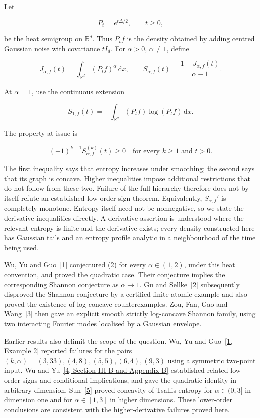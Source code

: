 \documentclass[
  11pt,
]{article}
\begin{document}
Let

\[
P_t=e^{t\Delta/2},\qquad t\geq0,
\]

be the heat semigroup on \(\mathbb R^d\). Thus \(P_tf\) is the density
obtained by adding centred Gaussian noise with covariance \(tI_d\). For
\(\alpha>0\), \(\alpha\ne1\), define

\[
\tag{1}
 J_{\alpha,f}(t)=\int_{\mathbb R^d}(P_tf)^\alpha\,\mathrm dx,
 \qquad
 S_{\alpha,f}(t)=\frac{1-J_{\alpha,f}(t)}{\alpha-1}.
\]

At \(\alpha=1\), use the continuous extension

\[
S_{1,f}(t)=-\int_{\mathbb R^d}(P_tf)\log(P_tf)\,\mathrm dx.
\]

The property at issue is

\[
\tag{2}
 (-1)^{k-1} S_{\alpha,f}^{(k)}(t)\geq0
 \quad\text{for every }k\geq1\text{ and }t>0.
\]

The first inequality says that entropy increases under smoothing; the
second says that its graph is concave. Higher inequalities impose
additional restrictions that do not follow from these two. Failure of
the full hierarchy therefore does not by itself refute an established
low-order sign theorem. Equivalently, \(S_{\alpha,f}'\) is completely
monotone. Entropy itself need not be nonnegative, so we state the
derivative inequalities directly. A derivative assertion is understood
where the relevant entropy is finite and the derivative exists; every
density constructed here has Gaussian tails and an entropy profile
analytic in a neighbourhood of the time being used.

Wu, Yu and Guo~\href{https://arxiv.org/abs/2312.01819v4}{{[}1{]}}
conjectured (2) for every \(\alpha\in(1,2)\), under this heat
convention, and proved the quadratic case. Their conjecture implies the
corresponding Shannon conjecture as \(\alpha\to1\). Gu and
Sellke~\href{https://arxiv.org/abs/2605.11656v1}{{[}2{]}} subsequently
disproved the Shannon conjecture by a certified finite atomic example
and also proved the existence of log-concave counterexamples. Zou, Fan,
Gao and Wang~\href{https://arxiv.org/abs/2608.30275v1}{{[}3{]}} then
gave an explicit smooth strictly log-concave Shannon family, using two
interacting Fourier modes localised by a Gaussian envelope.

Earlier results also delimit the scope of the question. Wu, Yu and
Guo~\href{https://arxiv.org/abs/2312.01819v4}{{[}1, Example 2{]}}
reported failures for the pairs
\((k,\alpha)=(3,33),(4,8),(5,5),(6,4),(9,3)\) using a symmetric
two-point input. Wu and
Yu~\href{https://arxiv.org/abs/2504.01837v2}{{[}4, Section III-B and
Appendix B{]}} established related low-order signs and conditional
implications, and gave the quadratic identity in arbitrary dimension.
Sun~\href{https://arxiv.org/abs/2601.12944v3}{{[}5{]}} proved concavity
of Tsallis entropy for \(\alpha\in(0,3]\) in dimension one and for
\(\alpha\in[1,3]\) in higher dimensions. These lower-order conclusions
are consistent with the higher-derivative failures proved here.
\end{document}
